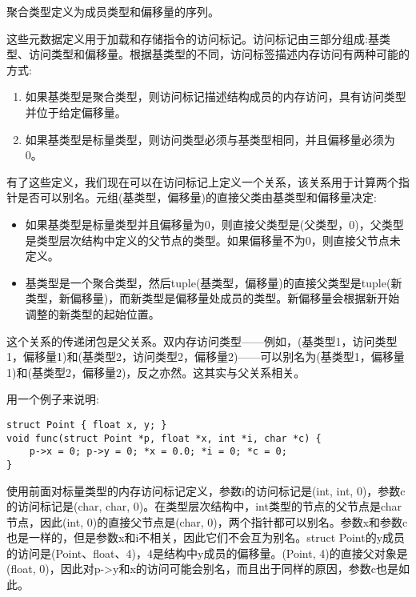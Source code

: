 聚合类型定义为成员类型和偏移量的序列。\par

这些元数据定义用于加载和存储指令的访问标记。访问标记由三部分组成:基类型、访问类型和偏移量。根据基类型的不同，访问标签描述内存访问有两种可能的方式:\par

\begin{enumerate}
\item 如果基类型是聚合类型，则访问标记描述结构成员的内存访问，具有访问类型并位于给定偏移量。
\item 如果基类型是标量类型，则访问类型必须与基类型相同，并且偏移量必须为0。
\end{enumerate}

有了这些定义，我们现在可以在访问标记上定义一个关系，该关系用于计算两个指针是否可以别名。元组(基类型，偏移量)的直接父类由基类型和偏移量决定:\par

\begin{itemize}
\item 如果基类型是标量类型并且偏移量为0，则直接父类型是(父类型，0)，父类型是类型层次结构中定义的父节点的类型。如果偏移量不为0，则直接父节点未定义。
\item 基类型是一个聚合类型，然后tuple(基类型，偏移量)的直接父类型是tuple(新类型，新偏移量)，而新类型是偏移量处成员的类型。新偏移量会根据新开始调整的新类型的起始位置。
\end{itemize}

这个关系的传递闭包是父关系。双内存访问类型——例如，(基类型1，访问类型1，偏移量1)和(基类型2，访问类型2，偏移量2)——可以别名为(基类型1，偏移量1)和(基类型2，偏移量2)，反之亦然。这其实与父关系相关。\par

用一个例子来说明:\par

\begin{lstlisting}[caption={}]
struct Point { float x, y; }
void func(struct Point *p, float *x, int *i, char *c) {
	p->x = 0; p->y = 0; *x = 0.0; *i = 0; *c = 0; 
}
\end{lstlisting}

使用前面对标量类型的内存访问标记定义，参数i的访问标记是(int, int, 0)，参数c的访问标记是(char, char, 0)。在类型层次结构中，int类型的节点的父节点是char节点，因此(int, 0)的直接父节点是(char, 0)，两个指针都可以别名。参数x和参数c也是一样的，但是参数x和i不相关，因此它们不会互为别名。struct Point的y成员的访问是(Point、float、4)，4是结构中y成员的偏移量。(Point, 4)的直接父对象是(float, 0)，因此对p->y和x的访问可能会别名，而且出于同样的原因，参数c也是如此。\par

